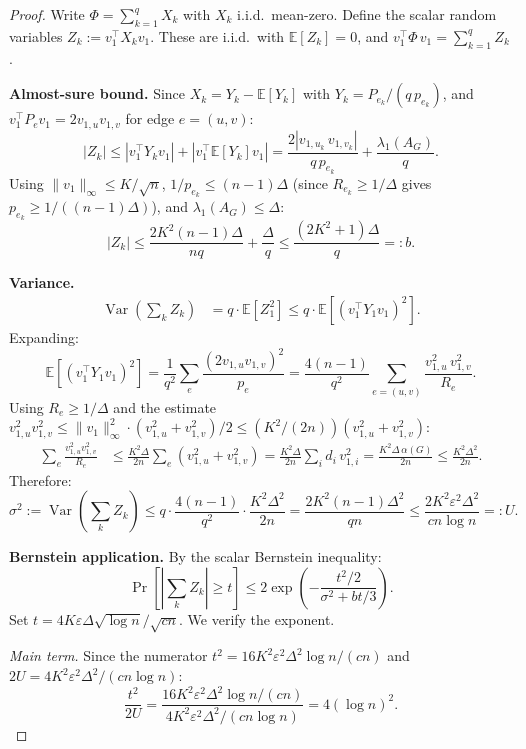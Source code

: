 \documentclass[10pt,a4paper]{amsart}
\newcommand{\E}{\mathbb{E}}
\DeclareMathOperator{\Var}{Var}
\newcommand{\eps}{\varepsilon}
\newcommand{\lamG}{\lambda_1(A_G)}
\newcommand{\vone}{v_1}
\begin{document}
\begin{proof}
Write $\Phi = \sum_{k=1}^q X_k$ with $X_k$ i.i.d.\ mean-zero.
Define the scalar random variables $Z_k := \vone^\top X_k \vone$. These are
i.i.d.\ with $\E[Z_k] = 0$, and $\vone^\top \Phi\,\vone = \sum_{k=1}^q Z_k$.

\medskip\noindent\textbf{Almost-sure bound.}
Since $X_k = Y_k - \E[Y_k]$ with $Y_k = P_{e_k}/(q\,p_{e_k})$, and
$\vone^\top P_e \vone = 2v_{1,u}v_{1,v}$ for edge $e = (u,v)$:
\[
|Z_k| \leq |\vone^\top Y_k \vone| + |\vone^\top \E[Y_k] \vone|
= \frac{2|v_{1,u_k}\,v_{1,v_k}|}{q\,p_{e_k}} + \frac{\lamG}{q}.
\]
Using $\|\vone\|_\infty \leq K/\sqrt{n}$, $1/p_{e_k} \leq (n-1)\Delta$
(since $R_{e_k} \geq 1/\Delta$ gives $p_{e_k} \geq 1/((n-1)\Delta)$), and
$\lamG \leq \Delta$:
\[
|Z_k| \leq \frac{2K^2(n-1)\Delta}{nq} + \frac{\Delta}{q}
\leq \frac{(2K^2+1)\Delta}{q} =: b.
\]

\medskip\noindent\textbf{Variance.}
\begin{align*}
\Var\!\left(\sum_k Z_k\right) &= q \cdot \E[Z_1^2] \leq q \cdot \E[(\vone^\top Y_1 \vone)^2].
\end{align*}
Expanding:
\[
\E[(\vone^\top Y_1 \vone)^2]
= \frac{1}{q^2} \sum_e \frac{(2v_{1,u}v_{1,v})^2}{p_e}
= \frac{4(n-1)}{q^2} \sum_{e=(u,v)} \frac{v_{1,u}^2\,v_{1,v}^2}{R_e}.
\]
Using $R_e \geq 1/\Delta$ and the estimate
$v_{1,u}^2 v_{1,v}^2 \leq \|\vone\|_\infty^2 \cdot (v_{1,u}^2 + v_{1,v}^2)/2
\leq (K^2/(2n))(v_{1,u}^2 + v_{1,v}^2)$:
\begin{align*}
\sum_e \frac{v_{1,u}^2 v_{1,v}^2}{R_e}
&\leq \frac{K^2\Delta}{2n}\sum_e (v_{1,u}^2 + v_{1,v}^2)
= \frac{K^2\Delta}{2n}\sum_i d_i\,v_{1,i}^2
= \frac{K^2\Delta\,\alpha(G)}{2n}
\leq \frac{K^2\Delta^2}{2n}.
\end{align*}
Therefore:
\[
\sigma^2 := \Var\!\left(\sum_k Z_k\right)
\leq q \cdot \frac{4(n-1)}{q^2} \cdot \frac{K^2\Delta^2}{2n}
= \frac{2K^2(n-1)\Delta^2}{qn}
\leq \frac{2K^2\eps^2\Delta^2}{cn\log n} =: U.
\]

\medskip\noindent\textbf{Bernstein application.}
By the scalar Bernstein inequality:
\[
\Pr\!\left[\left|\sum_k Z_k\right| \geq t\right]
\leq 2\exp\!\left(-\frac{t^2/2}{\sigma^2 + bt/3}\right).
\]
Set $t = 4K\eps\Delta\sqrt{\log n}/\sqrt{cn}$. We verify the exponent.

\medskip\noindent\emph{Main term.}
Since the numerator $t^2 = 16K^2\eps^2\Delta^2\log n/(cn)$ and
$2U = 4K^2\eps^2\Delta^2/(cn\log n)$:
\[
\frac{t^2}{2U}
= \frac{16K^2\eps^2\Delta^2\log n/(cn)}{4K^2\eps^2\Delta^2/(cn\log n)}
= 4(\log n)^2.
\]


\end{proof}
\end{document}
